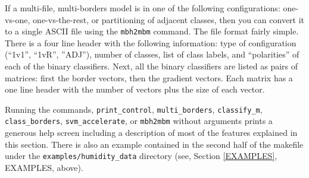 \documentclass[12pt]{article}
\begin{document}
If a multi-file, multi-borders model is in one of the following configurations:
one-vs-one, one-vs-the-rest, or partitioning of adjacent classes, then you
can convert it to a single ASCII file using the \verb/mbh2mbm/ command.
The file format fairly simple. There is a four line header with the 
following information: type of configuration (``1v1'', ``1vR'', ''ADJ''),
number of classes,
list of class labels, and
``polarities'' of each of the binary classifiers.
Next, all the binary classifiers are listed as pairs of matrices: 
first the border vectors, then the gradient vectors. 
Each matrix has a one line header with the number of vectors plus the size of each vector.

Running the commands, \verb/print_control/, \verb"multi_borders", \verb"classify_m", \verb"class_borders", \verb/svm_accelerate/, or \verb/mbh2mbm/ without arguments prints a generous help screen including a description of most of the features explained in this section.  There is also an example contained in the second half of the makefile under the \verb"examples/humidity_data" directory (see, Section \ref{EXAMPLES}, EXAMPLES, above).

\nocite{Kohonen2000}
\nocite{Michie_etal1994}
\nocite{Terrell_Scott1992}
\nocite{Mills2014}
\nocite{Mueller_etal2001}


\end{document}
